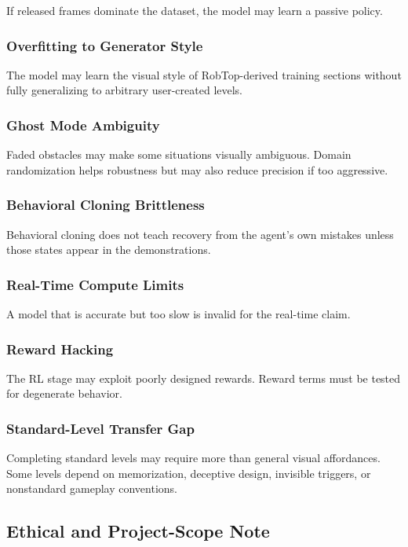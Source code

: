 \documentclass[11pt]{article}
\begin{document}
If released frames dominate the dataset, the model may learn a passive policy.

\subsubsection{Overfitting to Generator Style}

The model may learn the visual style of RobTop-derived training sections without fully generalizing to arbitrary user-created levels.

\subsubsection{Ghost Mode Ambiguity}

Faded obstacles may make some situations visually ambiguous. Domain randomization helps robustness but may also reduce precision if too aggressive.

\subsubsection{Behavioral Cloning Brittleness}

Behavioral cloning does not teach recovery from the agent's own mistakes unless those states appear in the demonstrations.

\subsubsection{Real-Time Compute Limits}

A model that is accurate but too slow is invalid for the real-time claim.

\subsubsection{Reward Hacking}

The RL stage may exploit poorly designed rewards. Reward terms must be tested for degenerate behavior.

\subsubsection{Standard-Level Transfer Gap}

Completing standard levels may require more than general visual affordances. Some levels depend on memorization, deceptive design, invisible triggers, or nonstandard gameplay conventions.

\subsection{Ethical and Project-Scope Note}
\end{document}
